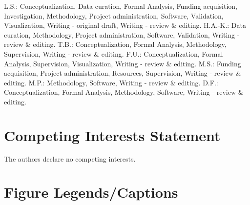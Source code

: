 \documentclass[5p,numafflabel]{elsarticle}
\begin{document}
L.S.:
Conceptualization,
Data curation,
Formal Analysis,
Funding acquisition,
Investigation,
Methodology,
Project administration,
Software,
Validation,
Visualization,
Writing - original draft,
Writing - review \& editing.
H.A.-K.:
Data curation,
Methodology,
Project administration,
Software,
Validation,
Writing - review \& editing.
T.B.:
Conceptualization,
Formal Analysis,
Methodology,
Supervision,
Writing - review \& editing.
F.U.:
Conceptualization,
Formal Analysis,
Supervision,
Visualization,
Writing - review \& editing.
M.S.:
Funding acquisition,
Project administration,
Resources,
Supervision,
Writing - review \& editing.
M.P.:
Methodology,
Software,
Writing - review \& editing.
D.F.:
Conceptualization,
Formal Analysis,
Methodology,
Software,
Writing - review \& editing.


\section*{Competing Interests Statement}

The authors declare no competing interests.


\section*{Figure Legends/Captions}


\end{document}
